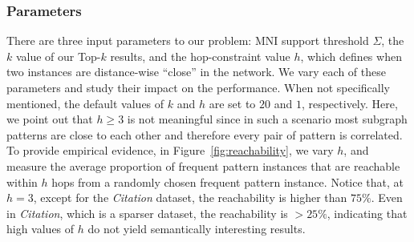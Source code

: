 \subsubsection{Parameters} There are three input parameters to our problem: MNI support threshold $\Sigma$, the $k$ value of our {\sf Top-$k$} results, and the hop-constraint value $h$, which defines when two instances are distance-wise ``close'' in the network. We vary  each of these parameters and study their impact on the performance. When not specifically mentioned, the default values of $k$ and $h$ are set to $20$ and $1$, respectively. Here, we point out that $h\geq 3$ is not meaningful since in such a scenario most subgraph patterns are close to each other and therefore every pair of pattern is correlated. To provide empirical evidence, in Figure~\ref{fig:reachability}, we vary $h$, and measure the average proportion of frequent pattern instances that are reachable within $h$ hops from a randomly chosen frequent pattern instance. Notice that, at $h=3$, except for the {\em Citation} dataset, the reachability is higher than $75\%$. Even in {\em Citation}, which is a sparser dataset, the reachability is $>25\%$, indicating that high values of $h$ do not yield semantically interesting results.
%
